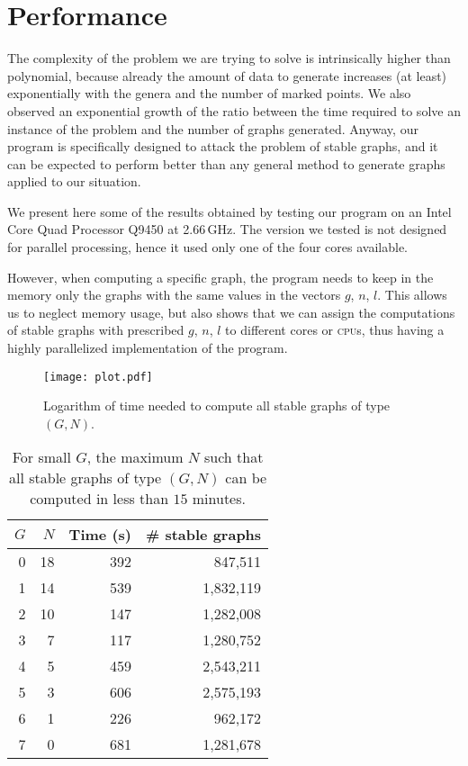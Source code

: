 \documentclass{amsart}
\theoremstyle{plain}
\theoremstyle{definition}
\begin{document}
\section{Performance}\label{sec:performance}

The complexity of the problem we are trying to solve is intrinsically
higher than polynomial, because already the amount of data to generate
increases (at least) exponentially with the genera and the number of
marked points. We also observed an exponential growth of the ratio
between the time required to solve an instance of the problem and the
number of graphs generated. Anyway, our program is specifically
designed to attack the problem of stable graphs, and it can be
expected to perform better than any general method to generate graphs
applied to our situation.

We present here some of the results obtained by testing our program on
an Intel\textregistered{} Core Quad Processor Q9450 at
2.66\,GHz. The version we tested is not designed for parallel
processing, hence it used only one of the four cores available.

However, when computing a specific graph, the program needs to keep in
the memory only the graphs with the same values in the vectors $g$,
$n$, $l$. This allows us to neglect memory usage, but also shows that
we can assign the computations of stable graphs with prescribed $g$,
$n$, $l$ to different cores or \textsc{cpu}s, thus having a highly
parallelized implementation of the program.

\begin{figure}[t]
  \texttt{[image: plot.pdf]}
  \caption{Logarithm of time needed to compute all stable graphs of
    type $(G, N)$.}\label{fig:plot}
\end{figure}

\begin{table}[t]
  \begin{tabular}{rrrr}
    $G$ & $N$ & Time (s) & \# stable graphs\\
    \hline
    0 & 18 & 392 &   847,511\\
    1 & 14 & 539 & 1,832,119\\
    2 & 10 & 147 & 1,282,008\\
    3 &  7 & 117 & 1,280,752\\
    4 &  5 & 459 & 2,543,211\\
    5 &  3 & 606 & 2,575,193\\
    6 &  1 & 226 &   962,172\\
    7 &  0 & 681 & 1,281,678
  \end{tabular}\vspace{\baselineskip}
  \caption{For small $G$, the maximum $N$ such that all stable graphs
    of type $(G,N)$ can be computed in less than $15$ minutes.}
  \label{tab:number}
\end{table}
\end{document}
